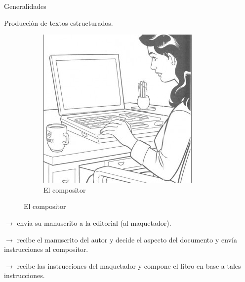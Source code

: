 \documentclass[10pt]{beamer}
\begin{document}
\begin{frame}{Generalidades}
\begin{block}{Producción de textos estructurados.}
\begin{multicols}{2}
\begin{figure}
			\vspace*{.25cm}				
			
			\begin{subfigure}[b]{0.5\textwidth} 
				\centering
				\includegraphics[scale=.12]{figures/compositor}
				\caption{El compositor}
			\end{subfigure}
		\end{figure}	
\newpage

\vspace*{.50cm}
$\rightarrow$ envía su manuscrito a la editorial (al maquetador). 

\vspace*{.70cm}
$\rightarrow$ recibe el manuscrito del autor y decide el aspecto del documento y envía instrucciones al compositor.

\vspace*{.50cm}
$\rightarrow$ recibe las instrucciones del maquetador y compone el libro en base a tales instrucciones.
\end{multicols}
	\end{block}
\end{frame}
\end{document}
